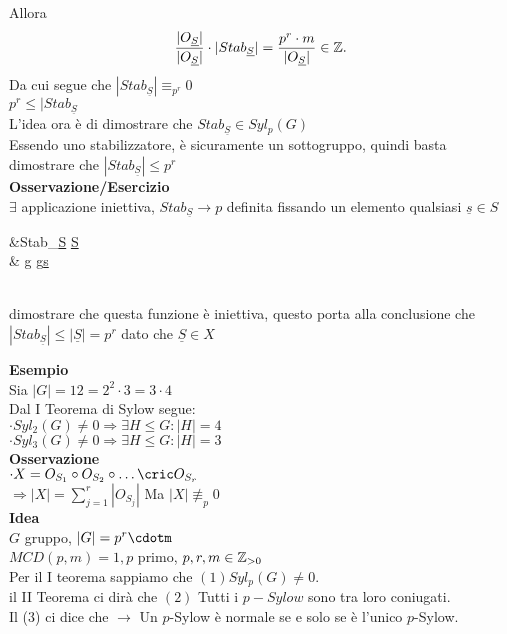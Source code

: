 \documentclass[12px]{article}
\begin{document}
{\begin{dimo}
		  Allora  
		   \[
			   \frac{|O_{\underline S}|}{|O_{\underline S}|}\cdot |Stab_{\underline S}| = \frac{p^r\cdot m}{|O_{\underline S}|}\in \mathbb{Z}
		  .\] 
		  Da cui segue che $|Stab_{\underline S}|\equiv_{p^r} 0$ \\
		  $p^r\leq |Stab_{\underline S}$\\
	  L'idea ora è di dimostrare che $Stab_{\underline S}\in Syl_p(G)$\\
	  Essendo uno stabilizzatore, è sicuramente un sottogruppo, quindi basta dimostrare che $|Stab_{\underline S}|\leq p^r$\\
	  \textbf{Osservazione/Esercizio}\\
	  $\exists$ applicazione iniettiva, $Stab_{\underline S} \rightarrow p$ definita fissando un elemento qualsiasi $\underline s\in S$ \\
	   \begin{aligned}
		   &Stab_{\underline S} \rightarrow \underline S\\
		   & g \rightarrow g\underline s
	  \end{aligned}\\
	  dimostrare che questa funzione è iniettiva, questo porta alla conclusione che $|Stab_{\underline S}|\leq |\underline S| = p^r$ dato che  $\underline S\in X$
	 \end{dimo}
	 \textbf{Esempio}\\
	 Sia $|G| = 12  = 2^2\cdot 3 = 3 \cdot 4$\\
	 Dal  I Teorema di Sylow segue:\\
	  $\cdot Syl_2(G)\neq 0 \Rightarrow \exists H\leq G : |H| = 4$ \\
	  $\cdot Syl_3(G)\neq 0 \Rightarrow \exists H\leq G : |H| = 3$ \\
	  \textbf{Osservazione}\\
	  $\cdot X = O_{S_1}\circ O_{S_2}\circ\ldots\cric O_{S_r}$\\
	  $ \Rightarrow |X| = \sum^r_{j=1} |O_{S_j}|$ Ma $|X|\not\equiv_p 0$\\
	  \textbf{Idea}\\
	  $G$ gruppo, $|G| = p^r \cdotm$\\
	  $MCD(p,m) = 1, p$ primo, $p,r,m\in\mathbb{Z}_{>0}$ \\
	  Per il I teorema sappiamo che $(1) Syl_p(G)\neq 0$.\\
	  il  II Teorema ci dirà che $(2)$ Tutti i $p-Sylow$ sono tra loro coniugati.\\
	  Il (3) ci dice che $ \rightarrow$ Un $p$-Sylow è normale se e solo se è l'unico $p$-Sylow.\\
}
\end{document}
